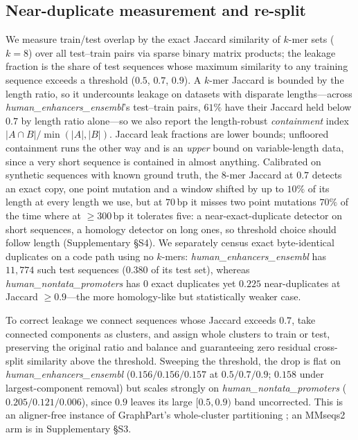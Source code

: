 \documentclass[webpdf,modern,large,namedate]{oup-authoring-template}%
\begin{document}
\subsection{Near-duplicate measurement and re-split}\label{sec:m-measure}
We measure train/test overlap by the exact Jaccard similarity of $k$-mer sets ($k=8$) over all test--train pairs via sparse binary matrix products; the leakage fraction is the share of test sequences whose maximum similarity to any training sequence exceeds a threshold ($0.5$, $0.7$, $0.9$). A $k$-mer Jaccard is bounded by the length ratio, so it undercounts leakage on datasets with disparate lengths---across \textit{human\_enhancers\_ensembl}'s test--train pairs, $61\%$ have their Jaccard held below $0.7$ by length ratio alone---so we also report the length-robust \emph{containment} index $|A\cap B|/\min(|A|,|B|)$. Jaccard leak fractions are lower bounds; unfloored containment runs the other way and is an \emph{upper} bound on variable-length data, since a very short sequence is contained in almost anything. Calibrated on synthetic sequences with known ground truth, the $8$-mer Jaccard at $0.7$ detects an exact copy, one point mutation and a window shifted by up to $10\%$ of its length at every length we use, but at $70$\,bp it misses two point mutations $70\%$ of the time where at $\ge300$\,bp it tolerates five: a near-exact-duplicate detector on short sequences, a homology detector on long ones, so threshold choice should follow length (Supplementary \S S4). We separately census exact byte-identical duplicates on a code path using no $k$-mers: \textit{human\_enhancers\_ensembl} has $11{,}774$ such test sequences ($0.380$ of its test set), whereas \textit{human\_nontata\_promoters} has $0$ exact duplicates yet $0.225$ near-duplicates at Jaccard $\ge0.9$---the more homology-like but statistically weaker case.

To correct leakage we connect sequences whose Jaccard exceeds $0.7$, take connected components as clusters, and assign whole clusters to train or test, preserving the original ratio and balance and guaranteeing zero residual cross-split similarity above the threshold. Sweeping the threshold, the drop is flat on \textit{human\_enhancers\_ensembl} ($0.156/0.156/0.157$ at $0.5/0.7/0.9$; $0.158$ under largest-component removal) but scales strongly on \textit{human\_nontata\_promoters} ($0.205/0.121/0.006$), since $0.9$ leaves its large $[0.5,0.9)$ band uncorrected. This is an aligner-free instance of GraphPart's whole-cluster partitioning \citep{teufel2023graphpart}; an MMseqs2 arm is in Supplementary \S S3.
\end{document}
